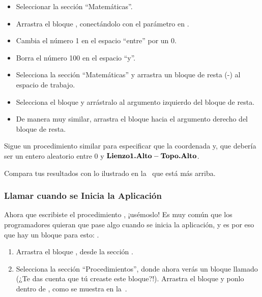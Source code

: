 {\begin{enumerate}
\begin{itemize}
\item Seleccionar la sección ``Matemáticas''.
\item Arrastra el bloque , conectándolo
  con el parámetro  en .
\item Cambia el número 1 en el espacio ``entre'' por un 0.
\item Borra el número 100 en el espacio ``y''.
\item Selecciona la sección ``Matemáticas'' y arrastra un bloque de
  resta (-) al espacio de trabajo.
\item Selecciona el bloque  y arrástralo al
  argumento izquierdo del bloque de resta.
\item De manera muy similar, arrastra el bloque 
  hacia el argumento derecho del bloque de resta.
\end{itemize}

Sigue un procedimiento similar para especificar que la coordenada
y, que debería ser un entero aleatorio entre 0 y
$\textbf{Lienzo1.Alto} - \textbf{Topo.Alto}$.

\end{enumerate}

Compara tus resultados con lo ilustrado en la~ que
está más arriba.

\subsubsection*{Llamar  cuando se Inicia la Aplicación}

Ahora que escribiste el procedimiento , ¡usémoslo!
Es muy común que los programadores quieran que pase algo cuando se
inicia la aplicación, y es por eso que hay un bloque para esto: .

\begin{enumerate}

\item Arrastra el bloque , desde la
  sección .

\item Selecciona la sección ``Procedimientos'', donde ahora verás un
  bloque llamado  (¿Te das cuenta que tú
  creaste este bloque?!). Arrastra el bloque y ponlo dentro de
  , como se muestra en
  la~.


\end{enumerate}}
